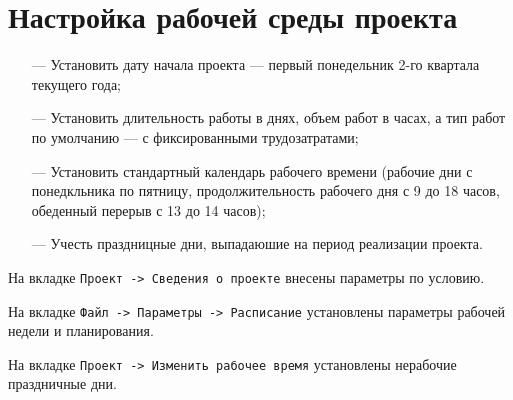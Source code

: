 \chapter{Настройка рабочей среды проекта}

\begin{itemize}
    \item[---] Установить дату начала проекта --- первый понедельник 2-го квартала текущего года;
    \item[---] Установить длительность работы в днях, объем работ в часах, а тип работ по умолчанию --- с фиксированными трудозатратами;
    \item[---] Установить стандартный календарь рабочего времени (рабочие дни с понедкльника по пятницу, продолжительность рабочего дня с 9 до 18 часов, обеденный перерыв с 13 до 14 часов);
    \item[---] Учесть праздницные дни, выпадаюшие на период реализации проекта.
\end{itemize}

На вкладке \texttt{Проект -> Сведения о проекте} внесены параметры по условию.


На вкладке \texttt{Файл -> Параметры -> Расписание} установлены параметры рабочей недели и планирования.


На вкладке \texttt{Проект -> Изменить рабочее время} установлены нерабочие праздничные дни.

